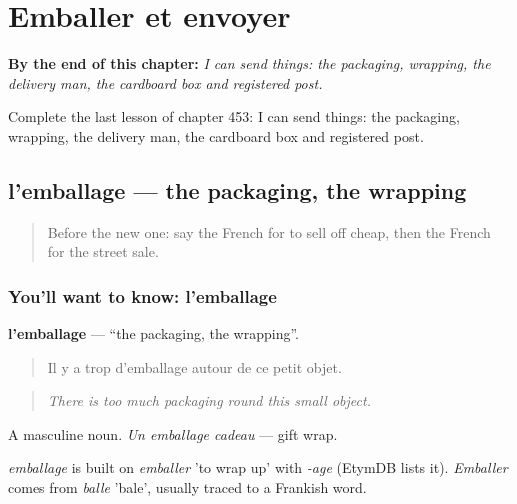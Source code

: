 
\chapter{Emballer et envoyer}
\label{ch:fr-emballer-et-envoyer}

\begin{chapteropening}
\textbf{By the end of this chapter:} \emph{I can send things: the packaging, wrapping, the delivery man, the cardboard box and registered post.}

Complete the last lesson of chapter 453: I can send things: the packaging, wrapping, the delivery man, the cardboard box and registered post.
\end{chapteropening}

\section[l'emballage]{l'emballage — the packaging, the wrapping}

\label{lesson:FR-C453-emballage}



\begin{quote}
Before the new one: say the French for to sell off cheap, then the French for the street sale.
\end{quote}

\subsection*{You'll want to know: l'emballage}
\textbf{l'emballage} — \textquotedblleft{}the packaging, the wrapping\textquotedblright{}.

\begin{quote}
Il y a trop d'emballage autour de ce petit objet.
\end{quote}

\begin{quote}
\emph{There is too much packaging round this small object.}
\end{quote}

A masculine noun. \emph{Un emballage cadeau} — gift wrap.

\begin{cousinweb}
\emph{emballage} is built on \emph{emballer} 'to wrap up' with \emph{-age} (EtymDB lists it). \emph{Emballer} comes from \emph{balle} 'bale', usually traced to a Frankish word.
\end{cousinweb}

